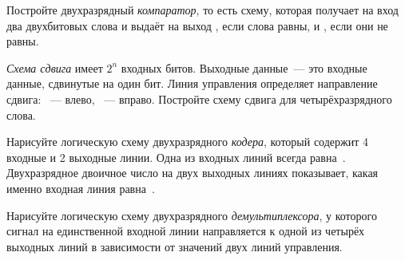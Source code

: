 \ExercisesSection
\begin{exercise}
\item Постройте двухразрядный \emph{компаратор}, то есть схему, которая получает на вход два двухбитовых слова и выдаёт на выход , если слова равны, и , если они не равны.

\item \emph{Схема сдвига} имеет \(2^n\) входных битов. Выходные данные~--- это входные данные, сдвинутые на один бит. Линия управления определяет направление сдвига: ~--- влево, ~--- вправо. Постройте схему сдвига для четырёхразрядного слова.

\item Нарисуйте логическую схему двухразрядного \emph{кодера}, который содержит 4 входные и 2 выходные линии. Одна из входных линий всегда равна~. Двухразрядное двоичное число на двух выходных линиях показывает, какая именно входная линия равна~.

\item Нарисуйте логическую схему двухразрядного \emph{демультиплексора}, у которого сигнал на единственной входной линии направляется к одной из четырёх выходных линий в зависимости от значений двух линий управления.

\end{exercise}
